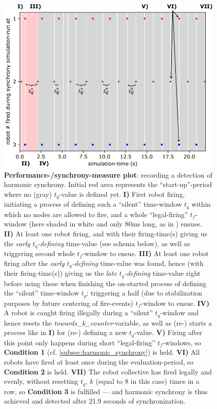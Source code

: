 		\begin{figure}
			\centering
			\includegraphics[width=\linewidth]{Assets/Figures/Illustrations/ExplanatoryIllustrativePerfMeasurePlot.pdf}
			\caption[A \textbf{performance-measure plot}.]{\textbf{Performance-/synchrony-measure plot}: recording a detection of harmonic synchrony. Initial red area represents the ``start-up''-period where no (gray) $t_q$-value is defined yet. \textbf{I)} First robot firing, initiating a process of defining such a ``silent'' time-window $t_q$ within which no nodes are allowed to fire, and a whole ``legal-firing'' $t_f$-window (here shaded in white and only 80ms long, as in \cite{nymoen_synch}) ensues. \textbf{II)} At least one robot firing, and with their firing-time(s) giving us the \textit{early $t_q$-defining} time-value (see schema below), as well as triggering second whole $t_f$-window to ensue. \textbf{III)} At least one robot firing after the \textit{early $t_q$-defining} time-value was found, hence (with their firing-time(s)) giving us the \textit{late $t_q$-defining} time-value right before using these when finishing the on-started process of defining the ``silent'' time-window $t_q$; triggering a half (due to stabilization purposes by future centering of fire-events) $t_f$-window to ensue. \textbf{IV)} A robot is caught firing illegally during a ``silent'' $t_q$-window and hence resets the \textit{towards\_k\_counter}-variable, as well as (re-) starts a process like in \textbf{I)} for (re-) defining a new $t_q$-value. \textbf{V)} Firing after this point only happens during short ``legal-firing'' $t_f$-windows, so \textbf{Condition 1} (cf. \ref{subsec:harmonic_synchrony}) is held. \textbf{VI)} All robots have fired at least once during the evaluation-period, so \textbf{Condition 2} is held. \textbf{VII)} The robot collective has fired legally and evenly, without resetting $t_q$, $k$ (equal to 8 in this case) times in a row, so \textbf{Condition 3} is fulfilled — and harmonic synchrony is thus achieved and detected after 21.9 seconds of synchronization.}
			\label{fig:perf_measure_plot}
		\end{figure}

